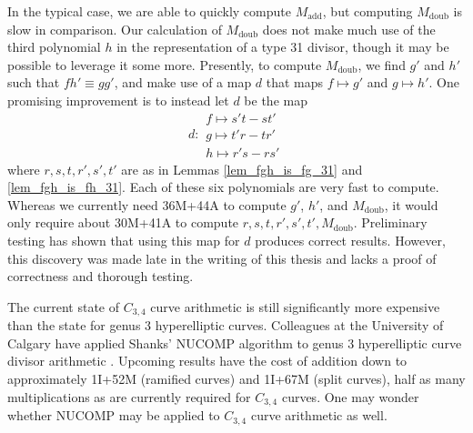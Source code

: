 In the typical case, we are able to quickly compute $M_{\text{add}}$, but computing $M_{\text{doub}}$ is slow in comparison.
Our calculation of $M_{\text{doub}}$ does not make much use of the third polynomial $h$ in the representation of a type 31 divisor,
though it may be possible to leverage it some more.
Presently, to compute $M_{\text{doub}}$, we find $g'$ and $h'$ such that $fh' \equiv gg'$,
and make use of a map $d$ that maps $f \mapsto g'$ and $g \mapsto h'$.
One promising improvement is to instead let $d$ be the map
\[ d : \begin{array}{l}
  f \mapsto s't - st' \\
  g \mapsto t'r - tr' \\
  h \mapsto r's - rs'
\end{array} \]
where $r, s, t, r', s', t'$ are as in Lemmas \ref{lem_fgh_is_fg_31} and \ref{lem_fgh_is_fh_31}.
Each of these six polynomials are very fast to compute.
Whereas we currently need 36M+44A to compute $g'$, $h'$, and $M_{\text{doub}}$,
it would only require about 30M+41A to compute $r,s,t,r',s',t',M_{\text{doub}}$.
Preliminary testing has shown that using this map for $d$ produces correct results.
However, this discovery was made late in the writing of this thesis
and lacks a proof of correctness and thorough testing.

The current state of $C_{3,4}$ curve arithmetic is still significantly
more expensive than the state for genus 3 hyperelliptic curves.
Colleagues at the University of Calgary have applied Shanks' NUCOMP algorithm \cite{shanks89}
to genus 3 hyperelliptic curve divisor arithmetic \cite{jacobson07}.
Upcoming results \cite{lindner_communication} have the cost of addition down to
approximately 1I+52M (ramified curves) and 1I+67M (split curves),
half as many multiplications as are currently required for $C_{3,4}$ curves.
One may wonder whether NUCOMP may be applied to $C_{3,4}$ curve arithmetic as well.
